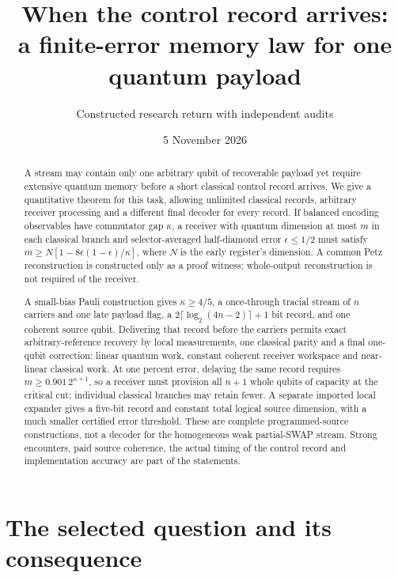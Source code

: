 \documentclass[11pt]{article}
\title{When the control record arrives:\\a finite-error memory law for one quantum payload}
\author{Constructed research return with independent audits}
\date{5 November 2026}
\begin{document}
\maketitle
\begin{abstract}
A stream may contain only one arbitrary qubit of recoverable payload yet
require extensive quantum memory before a short classical control record
arrives. We give a quantitative theorem for this task, allowing unlimited
classical records, arbitrary receiver processing and a different final decoder
for every record. If balanced encoding observables have commutator gap
$\kappa$, a receiver with quantum dimension at most $m$ in each classical
branch and selector-averaged half-diamond error $\epsilon\le1/2$ must satisfy
$m\ge N[1-8\epsilon(1-\epsilon)/\kappa]$, where $N$ is the early register's
dimension. A common Petz reconstruction is constructed only as a proof
witness; whole-output reconstruction is not required of the receiver.

A small-bias Pauli construction gives $\kappa\ge4/5$, a once-through tracial
stream of $n$ carriers and one late payload flag, a $2\lceil\log_2(4n-2)\rceil+1$
bit record, and one coherent source qubit. Delivering that record before the
carriers permits exact arbitrary-reference recovery by local measurements,
one classical parity and a final one-qubit correction: linear quantum work,
constant coherent receiver workspace and near-linear classical work. At one
percent error, delaying the same record requires $m\ge0.901\,2^{n+1}$, so a
receiver must provision all $n+1$ whole qubits of capacity at the critical cut;
individual classical branches may retain fewer. A separate imported local expander gives a five-bit record and
constant total logical source dimension, with a much smaller certified error
threshold. These are complete programmed-source constructions, not a decoder
for the homogeneous weak partial-SWAP stream. Strong encounters, paid source
coherence, the actual timing of the control record and implementation accuracy
are part of the statements.
\end{abstract}

\section{The selected question and its consequence}
\end{document}
